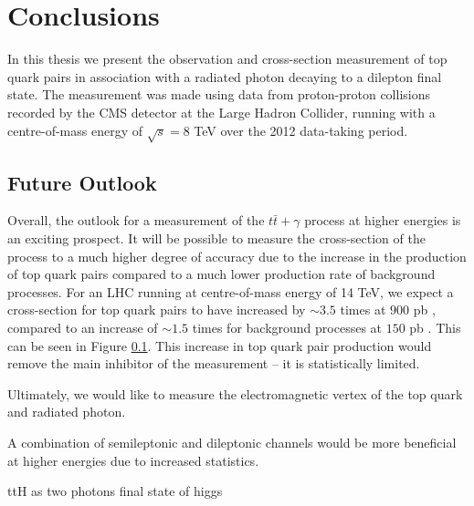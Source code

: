 \chapter*{Conclusions}\label{chap-conclusions}

In this thesis we present the observation and cross-section measurement of top quark pairs in association with a radiated photon decaying to a dilepton final state. The measurement was made using data from proton-proton collisions recorded by the CMS detector at the Large Hadron Collider, running with a centre-of-mass energy of $\sqrt{s} = 8$ TeV over the 2012 data-taking period. 

\section{Future Outlook}

Overall, the outlook for a measurement of the $t\bar{t}+\gamma$ process at higher energies is an exciting prospect. It will be possible to measure the cross-section of the process to a much higher degree of accuracy due to the increase in the production of top quark pairs compared to a much lower production rate of background processes. For an LHC running at centre-of-mass energy of 14 TeV, we expect a cross-section for top quark pairs to have increased by $\sim3.5$ times at $900$ pb \cite{}, compared to an increase of $\sim1.5$ times for background processes at $150$ pb \cite{}. This can be seen in Figure \ref{}. This increase in top quark pair production would remove the main inhibitor of the measurement -- it is statistically limited.

Ultimately, we would like to measure the electromagnetic vertex of the top quark and radiated photon. 

A combination of semileptonic and dileptonic channels would be more beneficial at higher energies due to increased statistics. 

ttH as two photons final state of higgs
